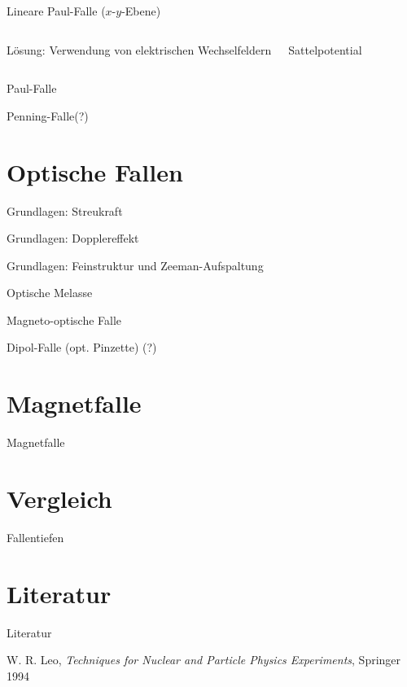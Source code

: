 \documentclass[12pt]{beamer}
\begin{document}
\begin{frame}{Lineare Paul-Falle ($x$-$y$-Ebene)}
	\begin{columns}[t]
		Lösung: Verwendung von elektrischen Wechselfeldern
		
		Sattelpotential
	\end{columns}
\end{frame}

\begin{frame}{Paul-Falle}
\end{frame}

\begin{frame}{Penning-Falle(?)}
\end{frame}


\section{Optische Fallen}

\begin{frame}{Grundlagen: Streukraft}
\end{frame}

\begin{frame}{Grundlagen: Dopplereffekt}
\end{frame}

\begin{frame}{Grundlagen: Feinstruktur und Zeeman-Aufspaltung}
\end{frame}

\begin{frame}{Optische Melasse}
\end{frame}

\begin{frame}{Magneto-optische Falle}
\end{frame}

\begin{frame}{Dipol-Falle (opt. Pinzette) (?)}
\end{frame}


\section{Magnetfalle}

\begin{frame}{Magnetfalle}
\end{frame}


\section{Vergleich}

\begin{frame}{Fallentiefen}
\end{frame}

\section{Literatur}

\begin{frame}{Literatur}
	\begin{thebibliography}{9}
		W. R. Leo,
		\emph{Techniques for Nuclear and Particle Physics Experiments},
		Springer 1994
	\end{thebibliography}
	
\end{frame}
\end{document}
